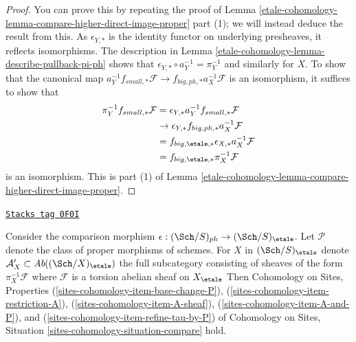 \begin{proof}
You can prove this by repeating the proof of
Lemma \ref{etale-cohomology-lemma-compare-higher-direct-image-proper} part (1);
we will instead deduce the result from this.
As $\epsilon_{Y, *}$ is the identity functor on underlying presheaves,
it reflects isomorphisms. The description
in Lemma \ref{etale-cohomology-lemma-describe-pullback-pi-ph}
shows that $\epsilon_{Y, *} \circ a_Y^{-1} = \pi_Y^{-1}$
and similarly for $X$. To show that the canonical map
$a_Y^{-1}f_{small, *}\mathcal{F} \to f_{big, ph, *}a_X^{-1}\mathcal{F}$
is an isomorphism, it suffices to show that
\begin{align*}
\pi_Y^{-1}f_{small, *}\mathcal{F}
& =
\epsilon_{Y, *}a_Y^{-1}f_{small, *}\mathcal{F} \\
& \to
\epsilon_{Y, *}f_{big, ph, *}a_X^{-1}\mathcal{F} \\
& =
f_{big, \etale, *} \epsilon_{X, *}a_X^{-1}\mathcal{F} \\
& =
f_{big, \etale, *}\pi_X^{-1}\mathcal{F}
\end{align*}
is an isomorphism. This is part
(1) of Lemma \ref{etale-cohomology-lemma-compare-higher-direct-image-proper}.
\end{proof}

\begin{lemma}
\label{etale-cohomology-lemma-compare-ph-etale}
\href{https://stacks.math.columbia.edu/tag/0F0I}{\texttt{Stacks tag 0F0I}}

Consider the comparison morphism
$\epsilon : (\Sch/S)_{ph} \to (\Sch/S)_\etale$.
Let $\mathcal{P}$ denote the class of proper morphisms of schemes.
For $X$ in $(\Sch/S)_\etale$ denote
$\mathcal{A}'_X \subset \textit{Ab}((\Sch/X)_\etale)$
the full subcategory consisting of sheaves of the form
$\pi_X^{-1}\mathcal{F}$ where $\mathcal{F}$ is a
torsion abelian sheaf on $X_\etale$
Then Cohomology on Sites, Properties
(\ref{sites-cohomology-item-base-change-P}),
(\ref{sites-cohomology-item-restriction-A}),
(\ref{sites-cohomology-item-A-sheaf}),
(\ref{sites-cohomology-item-A-and-P}), and
(\ref{sites-cohomology-item-refine-tau-by-P})
of Cohomology on Sites, Situation
\ref{sites-cohomology-situation-compare} hold.
\end{lemma}

